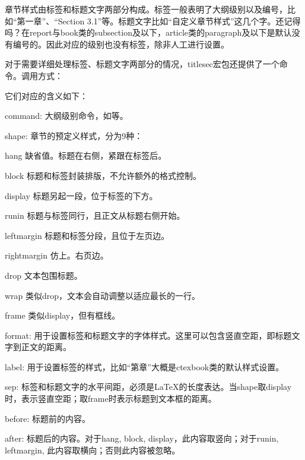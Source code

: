 章节样式由标签和标题文字两部分构成。标签一般表明了大纲级别以及编号，比如“第一章”、“Section 3.1”等。标题文字比如“自定义章节样式”这几个字。还记得吗？在report与book类的subsection及以下，article类的paragraph及以下是默认没有编号的。因此对应的级别也没有标签，除非人工进行设置。

对于需要详细处理标签、标题文字两部分的情况，titlesec宏包还提供了一个\latexline{\\titleformat}命令。调用方式：

它们对应的含义如下：
\begin{para}
\item[command:] 大纲级别命令，如\latexline{\\chapter}等。
\item[shape:] 章节的预定义样式，分为9种：
  \begin{para}
  \item[hang] 缺省值。标题在右侧，紧跟在标签后。
  \item[block] 标题和标签封装排版，不允许额外的格式控制。
  \item[display] 标题另起一段，位于标签的下方。
  \item[runin] 标题与标签同行，且正文从标题右侧开始。
  \item[leftmargin] 标题和标签分段，且位于左页边。
  \item[rightmargin] 仿上。右页边。
  \item[drop] 文本包围标题。
  \item[wrap] 类似drop，文本会自动调整以适应最长的一行。
  \item[frame] 类似display，但有框线。
  \end{para}
\item[format:] 用于设置标签和标题文字的字体样式。这里可以包含竖直空距，即标题文字到正文的距离。
\item[label:] 用于设置标签的样式，比如“第\latexline{\\chinese\\thechapter}章”大概是ctexbook类的默认样式设置。
\item[sep:] 标签和标题文字的水平间距，必须是\LaTeX 的长度表达。当shape取display时，表示竖直空距；取frame时表示标题到文本框的距离。
\item[before:] 标题前的内容。
\item[after:] 标题后的内容。对于hang, block, display，此内容取竖向；对于runin, leftmargin, 此内容取横向；否则此内容被忽略。
\end{para}

